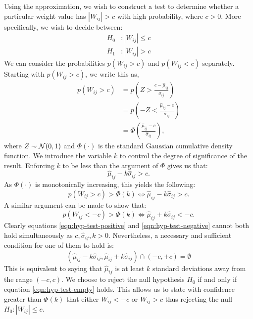 Using the approximation, we wish to construct a test to determine whether a particular weight value has $|W_{ij}| > c$ with high probability, where $c>0$. More specifically, we wish to decide between:
%
\begin{equation}
	\begin{aligned}
		H_0&: |W_{ij}| \leq c \\
		H_1&: |W_{ij}| > c
	\end{aligned}
\end{equation}
%
We can consider the probabilities $p(W_{ij} > c)$ and $p(W_{ij} < c)$ separately. Starting with $p(W_{ij} > c)$, we write this as,
%
\begin{align*}
	p(W_{ij} > c) &= p\left(Z > \frac{c - \hat{\mu}_{ij}}{\hat{\sigma}_{ij}}\right) \\
	&= p\left(-Z < \frac{\hat{\mu}_{ij} - c}{\hat{\sigma}_{ij}}\right)\\
	&= \Phi\left(\frac{\hat{\mu}_{ij} - c}{\hat{\sigma}_{ij}}\right),
\end{align*}
%
where $Z \sim \mathcal{N}(0,1)$ and $\Phi(\cdot)$ is the standard Gaussian cumulative density function. We introduce the variable $k$ to control the degree of significance of the result. Enforcing $k$ to be less than the argument of $\Phi$ gives us that: 
%
\begin{equation*}
	\hat{\mu}_{ij} - k \hat{\sigma}_{ij} > c.
\end{equation*}
%
As $\Phi(\cdot)$ is monotonically increasing, this yields the following:
%
\begin{equation}
	p(W_{ij} > c) > \Phi(k) \iff \hat{\mu}_{ij} - k \hat{\sigma}_{ij} > c.
	\label{eqn:hyp-test-positive}
\end{equation}
%
A similar argument can be made to show that:
%
\begin{equation}
	p(W_{ij} < -c) > \Phi(k) \iff \hat{\mu}_{ij} + k \hat{\sigma}_{ij} < -c.
	\label{eqn:hyp-test-negative}
\end{equation}
%
Clearly equations \ref{eqn:hyp-test-positive} and \ref{eqn:hyp-test-negative} cannot both hold simultaneously as $c, \hat{\sigma}_{ij}, k>0$. Nevertheless, a necessary and sufficient condition for one of them to hold is:
%
\begin{equation}
	(\hat{\mu}_{ij} - k \hat{\sigma}_{ij}, \hat{\mu}_{ij} + k \hat{\sigma}_{ij}) \cap (-c, +c) = \emptyset
	\label{eqn:hyp-test-empty}
\end{equation}
%
This is equivalent to saying that $\hat{\mu}_{ij}$ is at least $k$ standard deviations away from the range $(-c, c)$. We choose to reject the null hypothesis $H_0$ if and only if equation \ref{eqn:hyp-test-empty} holds. This allows us to state with confidence greater than $\Phi(k)$ that either $W_{ij} < -c$ or $W_{ij} > c$ thus rejecting the null $H_0: |W_{ij}| \leq c$.

